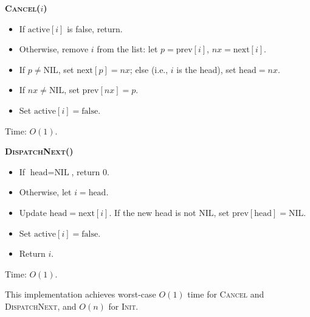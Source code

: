 \noindent \textbf{\textsc{Cancel($i$)}}
\begin{itemize}
            \item If $\text{active}[i]$ is false, return.
            \item Otherwise, remove $i$ from the list: let $p = \text{prev}[i]$, $nx = \text{next}[i]$.
            \item If $p \neq \text{NIL}$, set $\text{next}[p] = nx$; else (i.e., $i$ is the head), set $\text{head} = nx$.
            \item If $nx \neq \text{NIL}$, set $\text{prev}[nx] = p$.
            \item Set $\text{active}[i] = \text{false}$.
        \end{itemize}
        Time: $O(1)$.

\noindent \textbf{\textsc{DispatchNext()}}
\begin{itemize}
            \item If $\text{head} = \text{NIL}$, return 0.
            \item Otherwise, let $i = \text{head}$.
            \item Update $\text{head} = \text{next}[i]$. If the new head is not $\text{NIL}$, set $\text{prev}[\text{head}] = \text{NIL}$.
            \item Set $\text{active}[i] = \text{false}$.
            \item Return $i$.
        \end{itemize}
        Time: $O(1)$.       


This implementation achieves worst-case $O(1)$ time for \textsc{Cancel} and \textsc{DispatchNext}, and $O(n)$ for \textsc{Init}.

\newpage